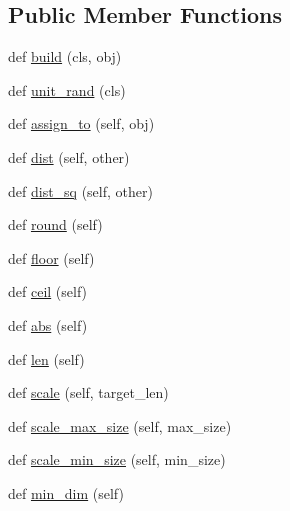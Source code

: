 \subsection*{Public Member Functions}
\begin{DoxyCompactItemize}
\item 
def \mbox{\hyperlink{classpysc2_1_1lib_1_1point_1_1_point_a9b49a1270fa755fab6f88a6229835a1e}{build}} (cls, obj)
\item 
def \mbox{\hyperlink{classpysc2_1_1lib_1_1point_1_1_point_ad2cff4370eeb8f921f978ecb442be278}{unit\+\_\+rand}} (cls)
\item 
def \mbox{\hyperlink{classpysc2_1_1lib_1_1point_1_1_point_ae064be8c97d0b23dbea4313f33548251}{assign\+\_\+to}} (self, obj)
\item 
def \mbox{\hyperlink{classpysc2_1_1lib_1_1point_1_1_point_ac3d3dfa8e7f11964c63174c926fded62}{dist}} (self, other)
\item 
def \mbox{\hyperlink{classpysc2_1_1lib_1_1point_1_1_point_a28e9c2a303182f9aaeeeb3fcbffe627b}{dist\+\_\+sq}} (self, other)
\item 
def \mbox{\hyperlink{classpysc2_1_1lib_1_1point_1_1_point_ad4670b56ce8374dd113d011f307dde86}{round}} (self)
\item 
def \mbox{\hyperlink{classpysc2_1_1lib_1_1point_1_1_point_ad8a708892540bb909d5877f1bb141ec0}{floor}} (self)
\item 
def \mbox{\hyperlink{classpysc2_1_1lib_1_1point_1_1_point_a6e9f32cef5a6f7137d459d37f5a8a9f7}{ceil}} (self)
\item 
def \mbox{\hyperlink{classpysc2_1_1lib_1_1point_1_1_point_a8669a363561c8c6645af0640c65ad66b}{abs}} (self)
\item 
def \mbox{\hyperlink{classpysc2_1_1lib_1_1point_1_1_point_a3678134e2099650c8708f6d885c26a20}{len}} (self)
\item 
def \mbox{\hyperlink{classpysc2_1_1lib_1_1point_1_1_point_a094a3d44c684f40df3ce8b2671b87780}{scale}} (self, target\+\_\+len)
\item 
def \mbox{\hyperlink{classpysc2_1_1lib_1_1point_1_1_point_a1fbc49cbcc8af8f335bce4490e8c5976}{scale\+\_\+max\+\_\+size}} (self, max\+\_\+size)
\item 
def \mbox{\hyperlink{classpysc2_1_1lib_1_1point_1_1_point_a1514760193eeaeb7c741eecf2d5c9b4a}{scale\+\_\+min\+\_\+size}} (self, min\+\_\+size)
\item 
def \mbox{\hyperlink{classpysc2_1_1lib_1_1point_1_1_point_a26ce1c0614b8f0ac3b81821caf796eaf}{min\+\_\+dim}} (self)
\item 

\end{DoxyCompactItemize}
